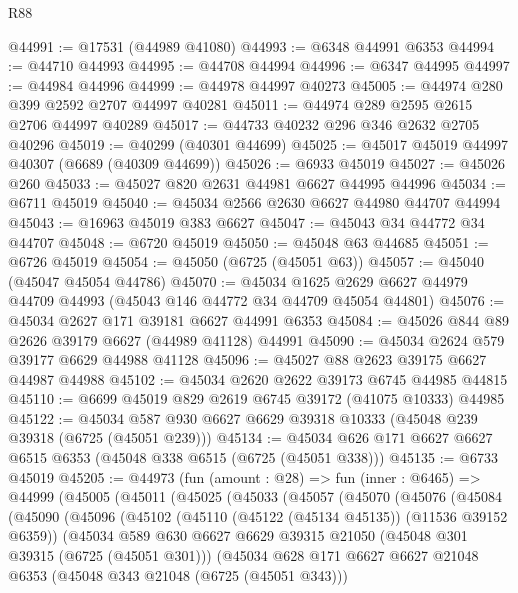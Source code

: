 \begin{lexlean}{R88}
\begin{coremodule}
@44991 := @17531 (@44989 @41080)
@44993 := @6348 @44991 @6353
@44994 := @44710 @44993
@44995 := @44708 @44994
@44996 := @6347 @44995
@44997 := @44984 @44996
@44999 := @44978 @44997 @40273
@45005 := @44974 @280 @399 @2592 @2707 @44997 @40281
@45011 := @44974 @289 @2595 @2615 @2706 @44997 @40289
@45017 := @44733 @40232 @296 @346 @2632 @2705 @40296
@45019 := @40299 (@40301 @44699)
@45025 := @45017 @45019 @44997 @40307 (@6689 (@40309 @44699))
@45026 := @6933 @45019
@45027 := @45026 @260
@45033 := @45027 @820 @2631 @44981 @6627 @44995 @44996
@45034 := @6711 @45019
@45040 := @45034 @2566 @2630 @6627 @44980 @44707 @44994
@45043 := @16963 @45019 @383 @6627
@45047 := @45043 @34 @44772 @34 @44707
@45048 := @6720 @45019
@45050 := @45048 @63 @44685
@45051 := @6726 @45019
@45054 := @45050 (@6725 (@45051 @63))
@45057 := @45040 (@45047 @45054 @44786)
@45070 := @45034
    @1625
    @2629
    @6627
    @44979
    @44709
    @44993
    (@45043 @146 @44772 @34 @44709 @45054 @44801)
@45076 := @45034 @2627 @171 @39181 @6627 @44991 @6353
@45084 := @45026 @844 @89 @2626 @39179 @6627 (@44989 @41128) @44991
@45090 := @45034 @2624 @579 @39177 @6629 @44988 @41128
@45096 := @45027 @88 @2623 @39175 @6627 @44987 @44988
@45102 := @45034 @2620 @2622 @39173 @6745 @44985 @44815
@45110 := @6699 @45019 @829 @2619 @6745 @39172 (@41075 @10333) @44985
@45122 := @45034 @587 @930 @6627 @6629 @39318 @10333 (@45048 @239 @39318 (@6725 (@45051 @239)))
@45134 := @45034 @626 @171 @6627 @6627 @6515 @6353 (@45048 @338 @6515 (@6725 (@45051 @338)))
@45135 := @6733 @45019
@45205 := @44973
    (fun (amount : @28) =>
    fun (inner : @6465) =>
    @44999
      (@45005
        (@45011
          (@45025
            (@45033
              (@45057
                (@45070
                  (@45076
                    (@45084
                      (@45090
                        (@45096
                          (@45102
                            (@45110 (@45122 (@45134 @45135)) (@11536 @39152 @6359))
                            (@45034
                              @589
                              @630
                              @6627
                              @6629
                              @39315
                              @21050
                              (@45048 @301 @39315 (@6725 (@45051 @301)))
                              (@45034
                                @628
                                @171
                                @6627
                                @6627
                                @21048
                                @6353
                                (@45048 @343 @21048 (@6725 (@45051 @343)))

\end{coremodule}
\end{lexlean}

